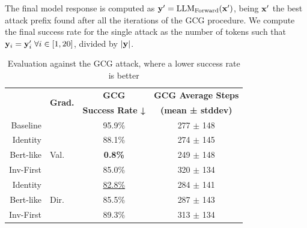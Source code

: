 \documentclass[../thesis.tex]{subfiles}
\begin{document}
The final model response is computed as $\mathbf{y}' = \text{LLM}_\text{Forward}(\mathbf{x}')$, being $\mathbf{x}'$ the best attack prefix found after all the iterations of the GCG procedure. We compute the final success rate for the single attack as the number of tokens such that $\mathbf{y}_i = \mathbf{y}'_i \; \forall i \in [1, 20]$, divided by $|\mathbf{y}|$.

\begin{table}[htbp]
\begin{tabular}{rlcc}
\toprule
           & \multirow{2}{*}{\textbf{Grad.}} & \textbf{GCG}             & \textbf{GCG Average Steps}   \\
           &                                 & \textbf{Success Rate ↓}  & \textbf{(mean ± stddev)}     \\
\midrule
Baseline   &                                 & 95.9\%                   & 277 $\pm$ 148                \\
\midrule
Identity   &                                 & 88.1\%                   & 274 $\pm$ 145                \\
Bert-like  & Val.                            & \textbf{0.8\%}           & 249 $\pm$ 148                \\
Inv-First  &                                 & 85.0\%                   & 320 $\pm$ 134                \\
\midrule
Identity   &                                 & \underline{82.8\%}       & 284 $\pm$ 141                \\
Bert-like  & Dir.                            & 85.5\%                   & 287 $\pm$ 143                \\
Inv-First  &                                 & 89.3\%                   & 313 $\pm$ 134                \\
\bottomrule
\end{tabular}
\vspace{0.25cm}
\caption{Evaluation against the GCG attack, where a lower success rate is better}
\label{tab:small_tinystories_gcg_results}
\end{table}
\end{document}
